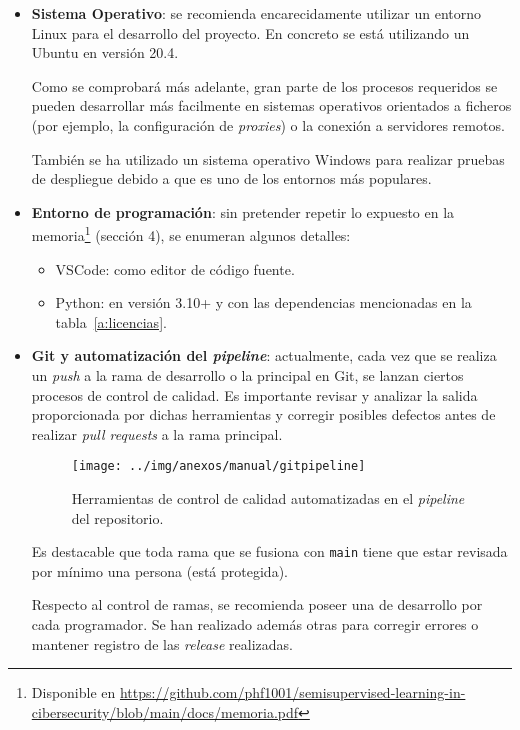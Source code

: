 \begin{itemize}

\item \textbf{Sistema Operativo}: se recomienda encarecidamente utilizar un entorno Linux para el desarrollo del proyecto. En concreto se está utilizando un Ubuntu en versión 20.4.

Como se comprobará más adelante, gran parte de los procesos requeridos se pueden desarrollar más facilmente en sistemas operativos orientados a ficheros (por ejemplo, la configuración de \textit{proxies}) o la conexión a servidores remotos.

También se ha utilizado un sistema operativo Windows para realizar pruebas de despliegue debido a que es uno de los entornos más populares.


\item \textbf{Entorno de programación}: sin pretender repetir lo expuesto en la memoria\footnote{Disponible en \url{https://github.com/phf1001/semisupervised-learning-in-cibersecurity/blob/main/docs/memoria.pdf}} (sección 4), se enumeran algunos detalles:

\begin{itemize}
	\item VSCode: como editor de código fuente.
	\item Python: en versión 3.10+ y con las dependencias mencionadas en la tabla~\ref{a:licencias}.
\end{itemize}

\item \textbf{Git y automatización del \textit{pipeline}}: actualmente, cada vez que se realiza un \textit{push} a la rama de desarrollo o la principal en Git, se lanzan ciertos procesos de control de calidad. Es importante revisar y analizar la salida proporcionada por dichas herramientas y corregir posibles defectos antes de realizar \textit{pull requests} a la rama principal.

\begin{figure}[h]
	\caption[Herramientas: control de calidad automatizado en el \textit{pipeline}.]{Herramientas de control de calidad automatizadas en el \textit{pipeline} del repositorio.}
	\centering
	\texttt{[image: ../img/anexos/manual/gitpipeline]}
\end{figure}

Es destacable que toda rama que se fusiona con \texttt{main} tiene que estar revisada por mínimo una persona (está protegida).

Respecto al control de ramas, se recomienda poseer una de desarrollo por cada programador. Se han realizado además otras para corregir errores o mantener registro de las \textit{release} realizadas.



\end{itemize}


